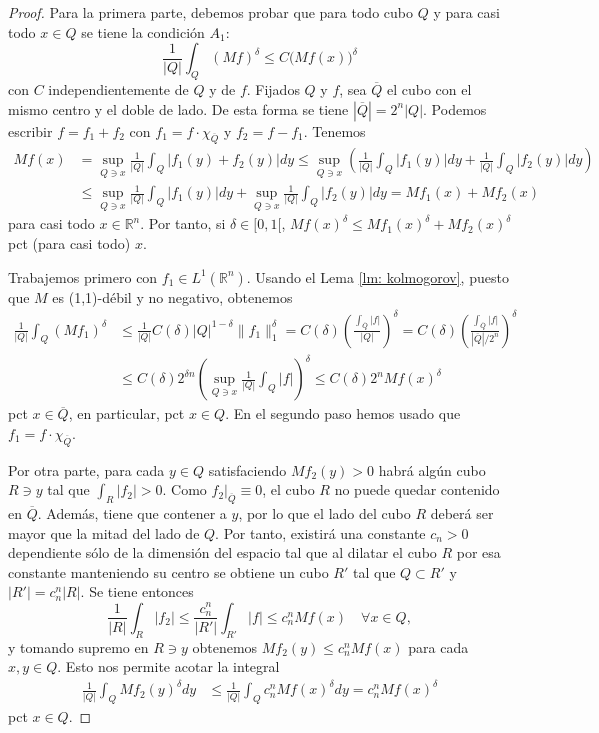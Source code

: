 \documentclass[12pt,english]{article}
\theoremstyle{definition}
\theoremstyle{remark}
\begin{document}
\begin{proof}
	Para la primera parte, debemos probar que para todo cubo $Q$ y para casi todo $x\in Q$ se tiene la condición $A_1$:
	\[\frac{1}{|Q|}\int_Q(Mf)^\delta\leq C\big(Mf(x)\big)^\delta\]
	con $C$ independientemente de $Q$ y de $f$. Fijados $Q$ y $f$, sea $\overline{Q}$ el cubo con el mismo centro y el doble de lado. De esta forma se tiene $|\overline{Q}|=2^n|Q|$. Podemos escribir $f=f_1+f_2$ con $f_1=f\cdot\chi_{\overline{Q}}$ y $f_2=f-f_1$. Tenemos
	\begin{align*}
	Mf(x)&=\sup_{Q\ni x}\frac{1}{|Q|}\int_Q|f_1(y)+f_2(y)|dy\leq\sup_{Q\ni x}\left(\frac{1}{|Q|}\int_Q|f_1(y)|dy+\frac{1}{|Q|}\int_Q|f_2(y)|dy\right) \\
	&\leq\sup_{Q\ni x}\frac{1}{|Q|}\int_Q|f_1(y)|dy+\sup_{Q\ni x}\frac{1}{|Q|}\int_Q|f_2(y)|dy=Mf_1(x)+Mf_2(x)
	\end{align*}
	para casi todo $x\in\mathbb{R}^n$. Por tanto, si $\delta\in [0,1[$, $Mf(x)^\delta\leq Mf_1(x)^\delta+Mf_2(x)^\delta$ pct (para casi todo) $x$.
	
	Trabajemos primero con $f_1\in L^1(\mathbb{R}^n)$. Usando el Lema \ref{lm: kolmogorov}, puesto que $M$ es (1,1)-débil y no negativo, obtenemos
	\begin{equation} \label{eq: cota int Mf1}
	\begin{split}
		\frac{1}{|Q|}\int_Q(Mf_1)^\delta &\leq\frac{1}{|Q|} C(\delta)|Q|^{1-\delta}\|f_1\|_1^\delta=C(\delta)\left(\frac{\int_{\overline{Q}}|f|}{|Q|}\right)^\delta =C(\delta)\left(\frac{\int_{\overline{Q}}|f|}{|\overline{Q}|/2^n}\right)^\delta \\ &\leq C(\delta)2^{\delta n} \left(\sup_{Q\ni x}\frac{1}{|Q|}\int_Q|f|\right)^\delta\leq C(\delta)2^{n} Mf(x)^\delta
	\end{split}
	\end{equation}
	pct $x\in\overline{Q}$, en particular, pct $x\in Q$. En el segundo paso hemos usado que $f_1=f\cdot\chi_{\overline{Q}}$.
	
	Por otra parte, para cada $y\in Q$ satisfaciendo $Mf_2(y)>0$ habrá algún cubo $R\ni y$ tal que $\int_R |f_2|>0$. Como $f_2|_{\overline{Q}}\equiv 0$, el cubo $R$ no puede quedar contenido en $\overline{Q}$. Además, tiene que contener a $y$, por lo que el lado del cubo $R$ deberá ser mayor que la mitad del lado de $Q$. Por tanto, existirá una constante $c_n>0$ dependiente sólo de la dimensión del espacio tal que al dilatar el cubo $R$ por esa constante manteniendo su centro se obtiene un cubo $R'$ tal que $Q\subset R'$ y $|R'|=c_n^n|R|$. Se tiene entonces
	\[\frac{1}{|R|}\int_R |f_2|\leq \frac{c_n^n}{|R'|}\int_{R'} |f|\leq c_n^n Mf(x) \quad\forall x\in Q,\]
	y tomando supremo en $R\ni y$ obtenemos $Mf_2(y)\leq c_n^n Mf(x)$ para cada $x,y\in Q$. Esto nos permite acotar la integral
	\begin{equation} \label{eq: cota int Mf2}
	\begin{split}
		\frac{1}{|Q|}\int_Q Mf_2(y)^\delta dy &\leq \frac{1}{|Q|}\int_Q c_n^n Mf(x)^\delta dy=c_n^n Mf(x)^\delta
	\end{split}
\end{equation}
pct $x\in Q$.


\end{proof}
\end{document}

